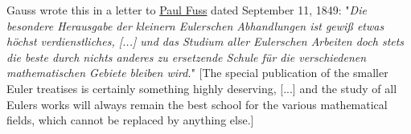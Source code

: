 \begin{enumerate}
{{  Gauss wrote this in a letter to \href{https://en.wikipedia.org/wiki/Paul_Fuss}{Paul Fuss} dated September 11, 1849: "{\emph{Die besondere Herausgabe der kleinern Eulerschen Abhandlungen ist gewiß etwas höchst verdienstliches, {[}...{]} und das Studium aller Eulerschen Arbeiten doch stets die beste durch nichts anderes zu ersetzende Schule für die verschiedenen mathematischen Gebiete bleiben wird.}}" {[}The special publication of the smaller Euler treatises is certainly something highly deserving, {[}...{]} and the study of all Euler\textquotesingle s works will always remain the best school for the various mathematical fields, which cannot be replaced by anything else.{]}}}
\end{enumerate}





